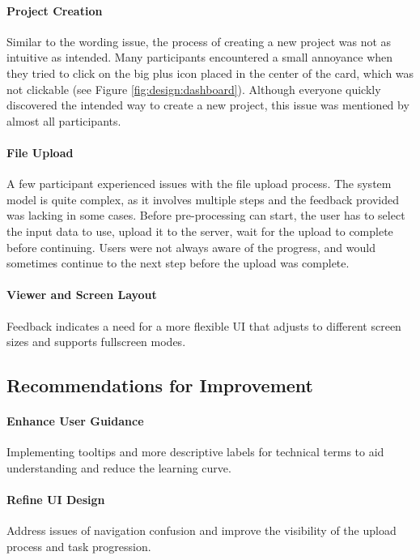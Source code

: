 \paragraph{Project Creation}
Similar to the wording issue, the process of creating a new project was not as intuitive as intended.
Many participants encountered a small annoyance when they tried to click on the big plus icon placed in the center of the card, which was not clickable (see Figure \ref{fig:design:dashboard}).
Although everyone quickly discovered the intended way to create a new project, this issue was mentioned by almost all participants.

\paragraph{File Upload}
\label{sec:results:issues:file_upload}
A few participant experienced issues with the file upload process.
The system model is quite complex, as it involves multiple steps and the feedback provided was lacking in some cases.
Before pre-processing can start, the user has to select the input data to use, upload it to the server, wait for the upload to complete before continuing.
Users were not always aware of the progress, and would sometimes continue to the next step before the upload was complete. 

\paragraph{Viewer and Screen Layout}
Feedback indicates a need for a more flexible UI that adjusts to different screen sizes and supports fullscreen modes.

\subsection*{Recommendations for Improvement}
\label{sec:results:recommendations}

\paragraph{Enhance User Guidance}
Implementing tooltips and more descriptive labels for technical terms to aid understanding and reduce the learning curve.

\paragraph{Refine UI Design}
Address issues of navigation confusion and improve the visibility of the upload process and task progression.

